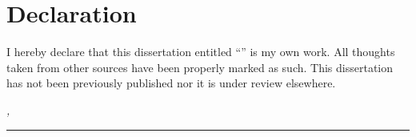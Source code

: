 \chapter*{Declaration}
\label{sec:declaration}
\thispagestyle{empty}

I hereby declare that this dissertation entitled ``\thesisTitle'' is my own work.
All thoughts taken from other sources have been properly marked as such.
This dissertation has not been previously published nor it is under review elsewhere.

\bigskip

\noindent\textit{\thesisUniversityCity, \thesisDate}

\smallskip

\begin{flushright}
	\begin{minipage}{5cm}
		\rule{\textwidth}{1pt}
		\centering\thesisAuthorName
	\end{minipage}
\end{flushright}

\cleardoublepage
